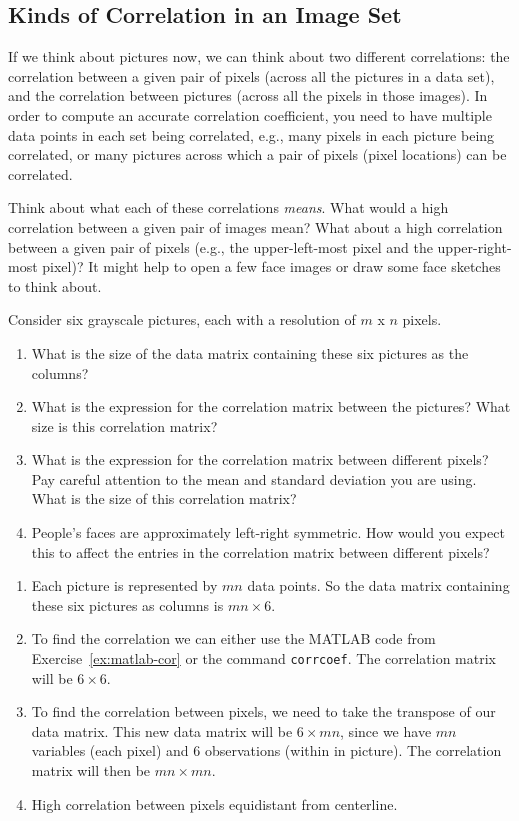 \subsection{Kinds of Correlation in an Image Set}

If we think about pictures now, we can think about two different correlations:  the correlation between a given pair of pixels (across all the pictures in a data set), and the correlation between pictures (across all the pixels in those images). In order to compute an accurate correlation coefficient, you need to have multiple data points in each set being correlated, e.g., many pixels in each picture being correlated, or many pictures across which a pair of pixels (pixel locations) can be correlated.

Think about what each of these correlations \textit{means}.  What would a high correlation between a given pair of images mean?  What about a high correlation between a given pair of pixels (e.g., the upper-left-most pixel and the upper-right-most pixel)? It might help to open a few face images or draw some face sketches to think about.

\begin{prob}
Consider six grayscale pictures, each with a resolution of $m$ x $n$ pixels.
    \begin{enumerate}
    \item  What is the size of the data matrix containing these six pictures as the columns?

    \item  What is the expression for the correlation matrix between the pictures?  What size is this correlation matrix?

    \item  What is the expression for the correlation matrix between different pixels? Pay careful attention to the mean and standard deviation you are using.  What is the size of this correlation matrix?
    \item People's faces are approximately left-right symmetric.  How would you expect this to affect the entries in the correlation matrix between different pixels?
\end{enumerate}
\end{prob}
\begin{sol}
\begin{enumerate}
    \item Each picture is represented by $mn$ data points. So the data matrix containing these six pictures as columns is $mn \times 6$.
    \item To find the correlation we can either use the MATLAB code from Exercise~\ref{ex:matlab-cor} or the command \texttt{corrcoef}. The correlation matrix will be $6 \times 6$.
    \item To find the correlation between pixels, we need to take the transpose of our data matrix. This new data matrix will be $6 \times mn$, since we have $mn$ variables (each pixel) and 6 observations (within in picture). The correlation matrix will then be $mn \times mn$.
    \item High correlation between pixels equidistant from centerline.
\end{enumerate}
\end{sol}

